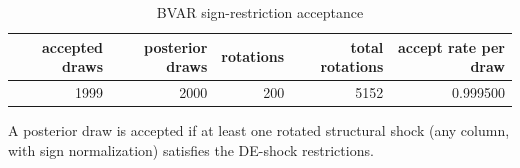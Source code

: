 \begin{table}[!htbp]
    \centering
    \caption{BVAR sign-restriction acceptance}
    \label{tab:bvar_accept}
    \begin{tabular}{rrrrr}
        \toprule
        accepted draws & posterior draws & rotations & total rotations & accept rate per draw \\
        \midrule
        1999           & 2000            & 200       & 5152            & 0.999500             \\
        \bottomrule
    \end{tabular}

    \begin{tablenotes}[flushleft]
        \footnotesize
        \item A posterior draw is accepted if at least one rotated structural shock (any column, with sign normalization) satisfies the DE-shock restrictions.
    \end{tablenotes}
\end{table}